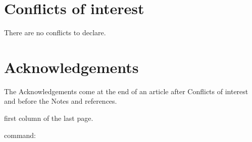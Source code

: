 \documentclass[twoside,twocolumn,9pt]{article}
\renewcommand{\refname}{Notes and references}
\begin{document}
\section*{Conflicts of interest}
There are no conflicts to declare.

\section*{Acknowledgements}
The Acknowledgements come at the end of an article after Conflicts of interest and before the Notes and references.


first column of the last page.

\balance

command:


\end{document}
